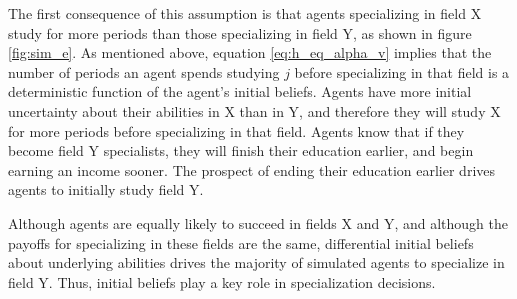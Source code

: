 The first consequence of this assumption is that agents specializing in field X study for more periods than those specializing in field Y, as shown in figure \ref{fig:sim_e}.
As mentioned above, equation \eqref{eq:h_eq_alpha_v} implies that the number of periods an agent spends studying $j$ before specializing in that field is a deterministic function of the agent's initial beliefs.
Agents have more initial uncertainty about their abilities in X than in Y, and therefore they will study X for more periods before specializing in that field.
Agents know that if they become field Y specialists, they will finish their education earlier, and begin earning an income sooner.
The prospect of ending their education earlier drives agents to initially study field Y.

Although agents are equally likely to succeed in fields X and Y, and although the payoffs for specializing in these fields are the same, differential initial beliefs about underlying abilities drives the majority of simulated agents to specialize in field Y.
Thus, initial beliefs play a key role in specialization decisions.



